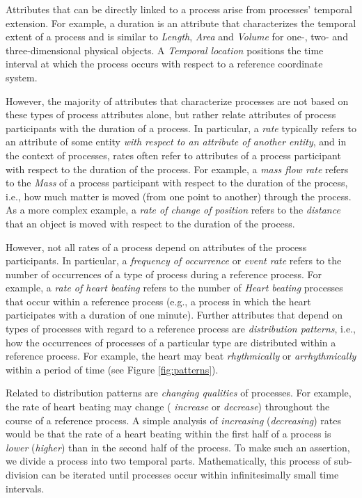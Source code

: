 \documentclass{bioinfo}
\begin{document}
Attributes that can be directly linked to a process arise from
processes' temporal extension. For example, a duration is an attribute
that characterizes the temporal extent of a process and is similar to
{\em Length}, {\em Area} and {\em Volume} for one-, two- and
three-dimensional physical objects. A {\em Temporal location}
positions the time interval at which the process occurs with respect
to a reference coordinate system.

However, the majority of attributes that characterize processes are
not based on these types of process attributes alone, but rather
relate attributes of process participants with the duration of a
process. In particular, a {\em rate} typically refers to an attribute
of some entity {\em with respect to an attribute of another entity},
and in the context of processes, rates often refer to attributes of a
process participant with respect to the duration of the process. For
example, a {\em mass flow rate} refers to the {\em Mass} of a process
participant with respect to the duration of the process, i.e., how
much matter is moved (from one point to another) through the process.
As a more complex example, a {\em rate of change of position} refers
to the {\em distance} that an object is moved with respect to the
duration of the process.

However, not all rates of a process depend on attributes of the
process participants. In particular, a {\em frequency of occurrence}
or {\em event rate} refers to the number of occurrences of a type of
process during a reference process. For example, a {\em rate of heart
  beating} refers to the number of {\em Heart beating} processes that
occur within a reference process (e.g., a process in which the heart
participates with a duration of one minute). Further attributes that
depend on types of processes with regard to a reference process are
{\em distribution patterns}, i.e., how the occurrences of processes of
a particular type are distributed within a reference process. For
example, the heart may beat {\em rhythmically} or {\em arrhythmically}
within a period of time (see Figure \ref{fig:patterns}).

Related to distribution patterns are {\em changing qualities} of
processes. For example, the rate of heart beating may change ({\em
  increase} or {\em decrease}) throughout the course of a reference
process. A simple analysis of {\em increasing} ({\em decreasing})
rates would be that the rate of a heart beating within the first half
of a process is {\em lower} ({\em higher}) than in the second half of
the process. To make such an assertion, we divide a process into two
temporal parts. Mathematically, this process of sub-division can be
iterated until processes occur within infinitesimally small time
intervals.
\end{document}
